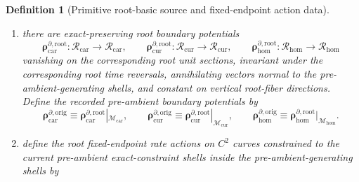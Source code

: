 \documentclass[11pt]{article}
\newcommand{\TensorDensityClass}{\mathscr N_{\mathrm{car}}}
\newcommand{\CurDensityClass}{\mathscr N_{\mathrm{cur}}}
\newcommand{\HomDensityClass}{\mathscr N_{\mathrm{hom}}}
\newcommand{\TensorFluxClass}{\mathscr J_{\mathrm{car}}}
\newcommand{\CurFluxClass}{\mathscr J_{\mathrm{cur}}}
\newcommand{\HomFluxClass}{\mathscr J_{\mathrm{hom}}}
\newcommand{\TensorPhaseReadClass}{\mathscr R_{\mathrm{car}}}
\newcommand{\CurPhaseReadClass}{\mathscr R_{\mathrm{cur}}}
\newcommand{\HomPhaseReadClass}{\mathscr R_{\mathrm{hom}}}
\newcommand{\TensorOriginSpace}{\mathcal M_{\mathrm{car}}}
\newcommand{\CurOriginSpace}{\mathcal M_{\mathrm{cur}}}
\newcommand{\HomOriginSpace}{\mathcal M_{\mathrm{hom}}}
\newcommand{\TensorOriginDensitySource}{\boldsymbol{q}_{\mathrm{car}}^{\mathrm{orig}}}
\newcommand{\CurOriginDensitySource}{\boldsymbol{q}_{\mathrm{cur}}^{\mathrm{orig}}}
\newcommand{\HomOriginDensitySource}{\boldsymbol{q}_{\mathrm{hom}}^{\mathrm{orig}}}
\newcommand{\TensorOriginFluxSource}{\boldsymbol{j}_{\mathrm{car}}^{\mathrm{orig}}}
\newcommand{\CurOriginFluxSource}{\boldsymbol{j}_{\mathrm{cur}}^{\mathrm{orig}}}
\newcommand{\HomOriginFluxSource}{\boldsymbol{j}_{\mathrm{hom}}^{\mathrm{orig}}}
\newcommand{\TensorOriginBoundarySource}{\boldsymbol{\rho}_{\mathrm{car}}^{\partial,\mathrm{orig}}}
\newcommand{\CurOriginBoundarySource}{\boldsymbol{\rho}_{\mathrm{cur}}^{\partial,\mathrm{orig}}}
\newcommand{\HomOriginBoundarySource}{\boldsymbol{\rho}_{\mathrm{hom}}^{\partial,\mathrm{orig}}}
\newcommand{\TensorRootSpace}{\mathcal R_{\mathrm{car}}}
\newcommand{\CurRootSpace}{\mathcal R_{\mathrm{cur}}}
\newcommand{\HomRootSpace}{\mathcal R_{\mathrm{hom}}}
\newcommand{\TensorRootDensitySource}{\boldsymbol{q}_{\mathrm{car}}^{\mathrm{root}}}
\newcommand{\CurRootDensitySource}{\boldsymbol{q}_{\mathrm{cur}}^{\mathrm{root}}}
\newcommand{\HomRootDensitySource}{\boldsymbol{q}_{\mathrm{hom}}^{\mathrm{root}}}
\newcommand{\TensorRootFluxSource}{\boldsymbol{j}_{\mathrm{car}}^{\mathrm{root}}}
\newcommand{\CurRootFluxSource}{\boldsymbol{j}_{\mathrm{cur}}^{\mathrm{root}}}
\newcommand{\HomRootFluxSource}{\boldsymbol{j}_{\mathrm{hom}}^{\mathrm{root}}}
\newcommand{\TensorRootBoundarySource}{\boldsymbol{\rho}_{\mathrm{car}}^{\partial,\mathrm{root}}}
\newcommand{\CurRootBoundarySource}{\boldsymbol{\rho}_{\mathrm{cur}}^{\partial,\mathrm{root}}}
\newcommand{\HomRootBoundarySource}{\boldsymbol{\rho}_{\mathrm{hom}}^{\partial,\mathrm{root}}}
\newtheorem{definition}{Definition}
\begin{document}
\begin{definition}[Primitive root-basic source and fixed-endpoint action data]
\begin{enumerate}
    \[
    \TensorRootDensitySource:\TensorRootSpace\to\TensorDensityClass,\qquad
    \CurRootDensitySource:\CurRootSpace\to\CurDensityClass,\qquad
    \HomRootDensitySource:\HomRootSpace\to\HomDensityClass,
    \]
    \[
    \TensorRootFluxSource:\TensorRootSpace\to\TensorFluxClass,\qquad
    \CurRootFluxSource:\CurRootSpace\to\CurFluxClass,\qquad
    \HomRootFluxSource:\HomRootSpace\to\HomFluxClass,
    \]
    invariant under the corresponding root time reversals, preserved along the current pre-ambient characteristic curves, and constant on pre-ambient-shell-normal directions and on vertical root-fiber directions. Define the recorded pre-ambient density and pre-ambient flux source fields by restriction:
    \begin{equation}
    \TensorOriginDensitySource\equiv\TensorRootDensitySource|_{\TensorOriginSpace},\qquad
    \CurOriginDensitySource\equiv\CurRootDensitySource|_{\CurOriginSpace},\qquad
    \HomOriginDensitySource\equiv\HomRootDensitySource|_{\HomOriginSpace},
    \label{eq:origin_density_from_root}
    \end{equation}
    \begin{equation}
    \TensorOriginFluxSource\equiv\TensorRootFluxSource|_{\TensorOriginSpace},\qquad
    \CurOriginFluxSource\equiv\CurRootFluxSource|_{\CurOriginSpace},\qquad
    \HomOriginFluxSource\equiv\HomRootFluxSource|_{\HomOriginSpace}.
    \label{eq:origin_flux_from_root}
    \end{equation}
    \item there are exact-preserving root boundary potentials
    \[
    \TensorRootBoundarySource:\TensorRootSpace\to\TensorPhaseReadClass,\qquad
    \CurRootBoundarySource:\CurRootSpace\to\CurPhaseReadClass,\qquad
    \HomRootBoundarySource:\HomRootSpace\to\HomPhaseReadClass
    \]
    vanishing on the corresponding root unit sections, invariant under the corresponding root time reversals, annihilating vectors normal to the pre-ambient-generating shells, and constant on vertical root-fiber directions. Define the recorded pre-ambient boundary potentials by
    \begin{equation}
    \TensorOriginBoundarySource\equiv\TensorRootBoundarySource|_{\TensorOriginSpace},\qquad
    \CurOriginBoundarySource\equiv\CurRootBoundarySource|_{\CurOriginSpace},\qquad
    \HomOriginBoundarySource\equiv\HomRootBoundarySource|_{\HomOriginSpace}.
    \label{eq:origin_boundary_from_root}
    \end{equation}
    \item define the root fixed-endpoint rate actions on \(C^2\) curves constrained to the current pre-ambient exact-constraint shells inside the pre-ambient-generating shells by

\end{enumerate}
\end{definition}
\end{document}
